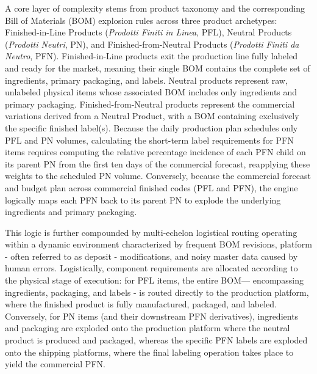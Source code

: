 A core layer of complexity stems from product taxonomy and the corresponding Bill of Materials (BOM) explosion rules across three product archetypes: 
Finished-in-Line Products (\textit{Prodotti Finiti in Linea}, PFL), Neutral Products (\textit{Prodotti Neutri}, PN), and Finished-from-Neutral Products (\textit{Prodotti Finiti da Neutro}, PFN). 
Finished-in-Line products exit the production line fully labeled and ready for the market, meaning their single BOM contains the complete set of ingredients, 
primary packaging, and labels. Neutral products represent raw, unlabeled physical items whose associated BOM includes only ingredients and primary packaging. 
Finished-from-Neutral products represent the commercial variations derived from a Neutral Product, with a BOM containing exclusively the specific finished label(s).
Because the daily production plan schedules only PFL and PN volumes, calculating the short-term label requirements for PFN items requires computing the relative 
percentage incidence of each PFN child on its parent PN from the first ten days of the commercial forecast, reapplying these weights to the scheduled PN volume. 
Conversely, because the commercial forecast and budget plan across commercial finished codes (PFL and PFN), the engine logically maps each PFN back to its parent PN 
to explode the underlying ingredients and primary packaging.

This logic is further compounded by multi-echelon logistical routing operating within a dynamic environment characterized by frequent BOM revisions, 
platform - often referred to as deposit - modifications, and noisy master data caused by human errors.
Logistically, component requirements are allocated according to the physical stage of execution: for PFL items, the entire BOM---
encompassing ingredients, packaging, and labels - is routed directly to the production platform, where the finished product is fully manufactured, packaged, and labeled. 
Conversely, for PN items (and their downstream PFN derivatives), ingredients and packaging are exploded onto the production platform where the neutral product 
is produced and packaged, whereas the specific PFN labels are exploded onto the shipping platforms, where the final labeling operation takes place to yield the commercial PFN.

